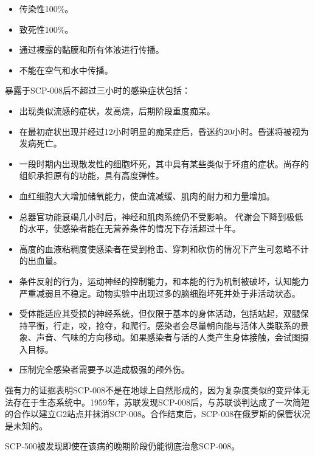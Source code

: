\begin{itemize}
\item 传染性100\%。
\item 致死性100\%。
\item 通过裸露的黏膜和所有体液进行传播。
\item 不能在空气和水中传播。
\end{itemize}

暴露于SCP-008后不超过三小时的感染症状包括：

\begin{itemize}
\item 出现类似流感的症状，发高烧，后期阶段重度痴呆。
\item 在最初症状出现并经过12小时明显的痴呆症后，昏迷约20小时。昏迷将被视为发病死亡。
\item 一段时期内出现散发性的细胞坏死，其中具有某些类似于坏疽的症状。尚存的组织承担原有的功能，具有高度弹性。
\item 血红细胞大大增加储氧能力，使血流减缓、肌肉的耐力和力量增加。
\item 总器官功能衰竭几小时后，神经和肌肉系统仍不受影响。
代谢会下降到极低的水平，使感染者能在无营养条件的情况下存活超过十年。
\item 高度的血液粘稠度使感染者在受到枪击、穿刺和砍伤的情况下产生可忽略不计的出血量。
\item 条件反射的行为，运动神经的控制能力，和本能的行为机制被破坏，认知能力严重减弱且不稳定。动物实验中出现过多的脑细胞坏死并处于非活动状态。
\item 受体能适应其受损的神经系统，但仅限于基本的身体活动，包括站起，双腿保持平衡，行走，咬，抢夺，和爬行。感染者会尽量朝向能与活体人类联系的景象、声音、气味的方向移动。如果感染者与活的人类产生身体接触，会试图摄入目标。
\item 压制完全感染者需要予以造成极强的颅外伤。
\end{itemize}

强有力的证据表明SCP-008不是在地球上自然形成的，因为复杂度类似的变异体无法存在于生态系统中。1959年，苏联发现SCP-008后，与苏联谈判达成了一次简短的合作以建立G2站点并抹消SCP-008。合作结束后，SCP-008在俄罗斯的保管状况是未知的。

SCP-500被发现即使在该病的晚期阶段仍能彻底治愈SCP-008。
